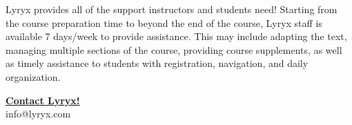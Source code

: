 \begin{center}
	\parbox{0.9\linewidth}{
		Lyryx provides all of the support instructors and students need! 
		Starting from the course preparation time to beyond the end of the
		course, Lyryx staff is available 7 days/week to provide
		assistance. This may include adapting the text, managing multiple
		sections of the course, providing course supplements, as well as timely
		assistance to students with registration, navigation, and daily
		organization.
	}
\end{center}

\medskip
\begin{center}
	\href{mailto:info@lyryx.com}{\textcolor{lscstextcolour}{\fontsize{16}{18}\selectfont\textbf{Contact Lyryx!}}}\\
	info@lyryx.com
\end{center}


\setlength{\parskip}{\baselineskip}